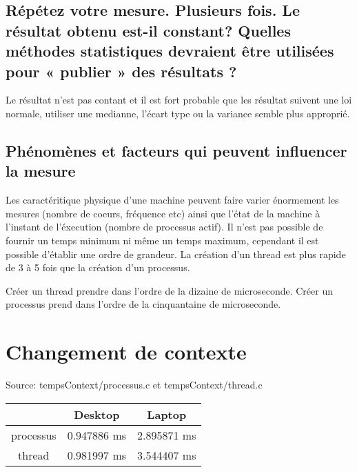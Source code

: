 \documentclass[12pt]{article}
\begin{document}
	\subsection{Répétez votre mesure. Plusieurs fois. Le résultat obtenu est-il constant? Quelles méthodes statistiques devraient être utilisées pour « publier » des résultats ?}

		Le résultat n'est pas contant et il est fort probable que les résultat suivent
		une loi normale, utiliser une medianne, l'écart type ou la variance semble plus approprié.
		\newline

	\subsection{Phénomènes et facteurs qui peuvent influencer la mesure}

		Les caractéritique physique d'une machine peuvent faire varier énormement les
		mesures (nombre de coeurs, fréquence etc) ainsi que l'état de la machine à
		l'instant de l'éxecution (nombre de processus actif).
		Il n'est pas possible de fournir un temps minimum ni même un temps maximum,
		cependant il est possible d'établir une ordre de grandeur.
		La création d'un thread est plus rapide de 3 à 5 fois que la création d'un
		processus.\newline

		Créer un thread prendre dans l'ordre de la dizaine de microseconde. \newline
		Créer un processus prend dans l'ordre de la cinquantaine de microseconde.\newline

\section{Changement de contexte}

Source: tempsContext/processus.c et tempsContext/thread.c

\begin{center}
	\begin{tabular}{ | c | c | c | }
		\hline
			&	Desktop      &    Laptop \\
		\hline
			processus & 0.947886 ms &  2.895871 ms \\
		\hline
			thread    & 0.981997 ms &  3.544407 ms \\
		\hline
	\end{tabular}
\end{center}
\end{document}
